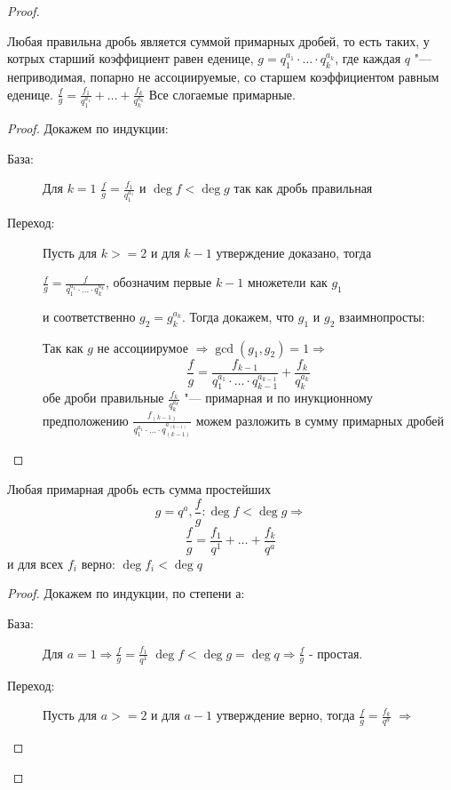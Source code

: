 \begin{theorem}{}
\begin{proof}
\begin{lemma}
Любая правильна дробь является суммой примарных дробей, то есть таких, у котрых старший
коэффициент равен еденице, $g = q_1^{a_1}\cdot\dots\cdot q_k^{a_k}$, где каждая $q$ "--- неприводимая,
попарно не ассоциируемые, со старшем коэффициентом равным еденице.  
$\frac{f}{g} = \frac{f_1}{q_1^{a_1}} + \dots + \frac{f_k}{q_k^{a_{k}}}$
Все слогаемые примарные.
\end{lemma}

\begin{proof}
Докажем по индукции:
\begin{description}
\item[База:] Для $k = 1$
$\frac{f}{g} = \frac{f_1}{q_1^{a_1}}$ и $\deg f < \deg g$ так как дробь правильная
\item[Переход:] Пусть для $k >= 2$ и для $k - 1$ утверждение доказано, тогда

$\frac{f}{g} = \frac{f}{q_1^{a_1}\cdot\dots\cdot q_k^{a_k}}$, обозначим первые $k - 1$ множетели как $g_1$

и соответственно $g_2 = g_k^{a_k}$. Тогда докажем, что $g_1$ и  $g_2$ взаимнопросты:

Так как $g$ не ассоциирумое $\Rightarrow \gcd(g_1, g_2) = 1 \Rightarrow$
$$\frac{f}{g} = \frac{f_{k-1}}{q_1^{a_1}\cdot\dots\cdot q_{k-1}^{a_{k-1}}} + \frac{f_k}{q_k^{a_k}}$$
обе дроби правильные $\frac{f_k}{q_k^{a_k}}$ "--- примарная и по инукционному предположению
$\frac{f_(k-1)}{q_1^{a_1}\cdot\dots\cdot q_(k-1)^{a_(k-1)}}$ можем разложить в сумму примарных дробей  
\end{description}
\end{proof}

\begin{lemma}
Любая примарная дробь есть сумма простейших
$$g = q^a, \frac{f}{g} \colon \deg f < \deg g \Rightarrow$$
$$\frac{f}{g} = \frac{f_1}{q^1} + \dots + \frac{f_k}{q^a}$$
 и для всех $f_i$ верно: $\deg f_i < \deg q$
\end{lemma}

\begin{proof}
Докажем по индукции, по степени $а$:
\begin{description}
\item[База:] Для $a = 1 \Rightarrow \frac{f}{g} = \frac{f_1}{q^1}$
$\deg f < \deg g = \deg q \Rightarrow \frac{f}{g}$ - простая. 
\item[Переход:] Пусть для $a >= 2$ и для $a - 1$ утверждение верно, тогда 
$\frac{f}{g} = \frac{f_k}{q^a}$ $\Rightarrow$
 

\end{description}
\end{proof}
\end{proof}
\end{theorem}
